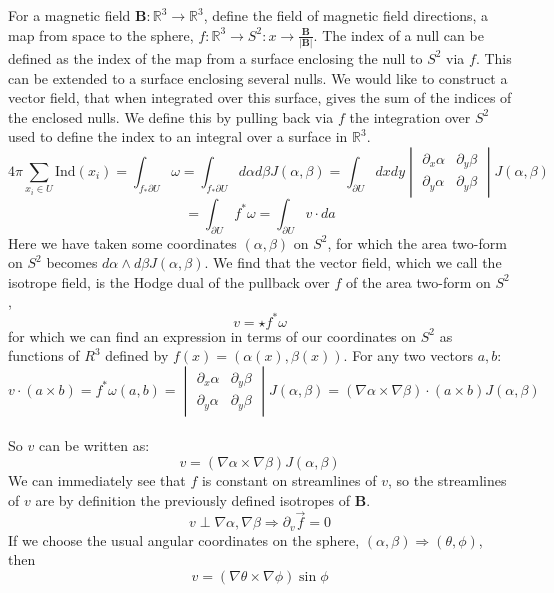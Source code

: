 \documentclass[12pt,a4paper,oneside]{article}
\begin{document}
For a magnetic field $\mathbf{B}:\mathbb{R}^3\rightarrow\mathbb{R}^3$, define the field of magnetic field directions, a map from space to the sphere, $f:\mathbb{R}^3\rightarrow S^2:x\rightarrow\frac{\mathbf{B}}{|\mathbf{B}|}$. The index of a null can be defined as the index of the map from a surface enclosing the null to $S^2$ via $f$. This can be extended to a surface enclosing several nulls. We would like to construct a vector field, that when integrated over this surface, gives the sum of the indices of the enclosed nulls. We define this by pulling back via $f$ the integration over $S^2$ used to define the index to an integral over a surface in $\mathbb{R}^3$.\\
$$4\pi\sum_{x_i\in U}\mathrm{Ind}(x_i)=\int_{f_*\partial U}\omega=\int_{f_*\partial U}d\alpha d\beta J(\alpha,\beta)=\int_{\partial U}dxdy
\begin{vmatrix}
  \partial_x\alpha & \partial_y \beta \\
  \partial_y\alpha & \partial_y \beta
\end{vmatrix}
J(\alpha,\beta)$$
$$=\int_{\partial U}f^*\omega=\int_{\partial U}v\cdot da$$
Here we have taken some coordinates $(\alpha,\beta)$ on $S^2$, for which the area two-form on $S^2$ becomes $d\alpha\wedge d\beta J(\alpha,\beta)$. We find that the vector field, which we call the isotrope field, is the Hodge dual of the pullback over $f$ of the area two-form on $S^2$,
$$v=\star f^*\omega$$
for which we can find an expression in terms of our coordinates on $S^2$ as functions of $R^3$ defined by $f(x)=(\alpha(x),\beta(x))$. For any two vectors $a,b$:
$$v\cdot(a\times b)=f^*\omega(a,b)=
\begin{vmatrix}
  \partial_x\alpha & \partial_y \beta \\
  \partial_y\alpha & \partial_y \beta
\end{vmatrix}
J(\alpha,\beta)=(\nabla\alpha\times\nabla\beta)\cdot(a\times b)J(\alpha,\beta)$$\\
So $v$ can be written as:
$$v=(\nabla\alpha\times\nabla\beta)J(\alpha,\beta)$$
We can immediately see that $f$ is constant on streamlines of $v$, so the streamlines of $v$ are by definition the previously defined isotropes of $\mathbf{B}$.
$$v\perp\nabla\alpha,\nabla\beta\Rightarrow\partial_v\vec f=0$$
If we choose the usual angular coordinates on the sphere, $(\alpha,\beta)\Rightarrow(\theta,\phi)$, then
$$v=(\nabla\theta\times\nabla\phi)\sin\phi$$
\end{document}
